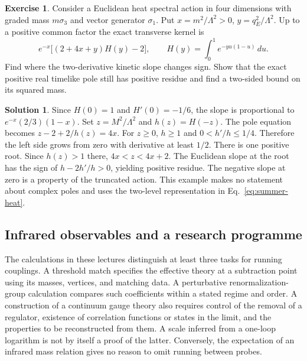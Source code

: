 \documentclass[10pt]{article}
\theoremstyle{definition}
\newtheorem{exercise}{Exercise}
\newtheorem{solution}{Solution}
\begin{document}
\begin{exercise}
Consider a Euclidean heat spectral action in four dimensions with graded mass \(m\sigma_3\) and vector generator \(\sigma_1\). Put \(x=m^2/\Lambda^2>0\), \(y=q_E^2/\Lambda^2\). Up to a positive common factor the exact transverse kernel is
\begin{equation}
 e^{-x}\big[(2+4x+y)H(y)-2\big],\qquad
 H(y)=\int_0^1 e^{-yu(1-u)}\,du .
 \label{eq:summer-heat}
\end{equation}
Find where the two-derivative kinetic slope changes sign. Show that the exact positive real timelike pole still has positive residue and find a two-sided bound on its squared mass.
\end{exercise}

\begin{solution}
Since \(H(0)=1\) and \(H'(0)=-1/6\), the slope is proportional to \(e^{-x}(2/3)(1-x)\). Set \(z=M^2/\Lambda^2\) and \(h(z)=H(-z)\). The pole equation becomes \(z-2+2/h(z)=4x\). For \(z\ge0\), \(h\ge1\) and \(0<h'/h\le1/4\). Therefore the left side grows from zero with derivative at least \(1/2\). There is one positive root. Since \(h(z)>1\) there, \(4x<z<4x+2\). The Euclidean slope at the root has the sign of \(h-2h'/h>0\), yielding positive residue. The negative slope at zero is a property of the truncated action. This example makes no statement about complex poles and uses the two-level representation in Eq.~\eqref{eq:summer-heat}.
\end{solution}

\subsection{Infrared observables and a research programme}

The calculations in these lectures distinguish at least three tasks for running couplings. A threshold match specifies the effective theory at a subtraction point using its masses, vertices, and matching data. A perturbative renormalization-group calculation compares such coefficients within a stated regime and order. A construction of a continuum gauge theory also requires control of the removal of a regulator, existence of correlation functions or states in the limit, and the properties to be reconstructed from them. A scale inferred from a one-loop logarithm is not by itself a proof of the latter. Conversely, the expectation of an infrared mass relation gives no reason to omit running between probes.
\end{document}
